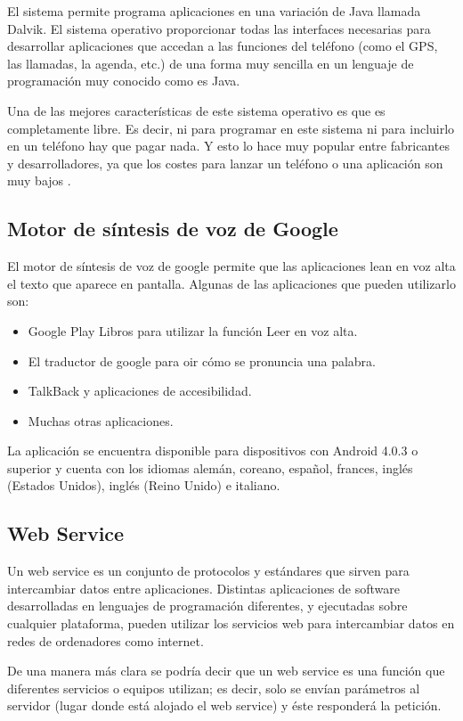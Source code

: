 		El sistema permite programa aplicaciones en una variación de Java llamada Dalvik. El sistema operativo proporcionar todas las interfaces necesarias para desarrollar aplicaciones que accedan a las funciones del teléfono (como el GPS, las llamadas, la agenda, etc.) de una forma muy sencilla en un lenguaje de programación muy conocido como es Java.

		Una de las mejores características de este sistema operativo es que es completamente libre. Es decir, ni para programar en este sistema ni para incluirlo en un teléfono hay que pagar nada. Y esto lo hace muy popular entre fabricantes y desarrolladores, ya que los costes para lanzar un teléfono o una aplicación son muy bajos \cite{Nieto2011}.

		\subsection{Motor de síntesis de voz de Google}

		El motor de síntesis de voz de google permite que las aplicaciones lean en voz alta el texto que aparece en pantalla. Algunas de las aplicaciones que pueden utilizarlo son:
	
		\begin{itemize}
			\item Google Play Libros para utilizar la función Leer en voz alta.
			\item El traductor de google para oir cómo se pronuncia una palabra.
			\item TalkBack y aplicaciones de accesibilidad.
			\item Muchas otras aplicaciones.
		\end{itemize}

		La aplicación se encuentra disponible para dispositivos con Android 4.0.3 o superior y cuenta con los idiomas alemán, coreano, español, frances, inglés (Estados Unidos), inglés (Reino Unido) e italiano.
		
		\subsection{Web Service}
		
		Un web service es un conjunto de protocolos y estándares que sirven para intercambiar datos entre aplicaciones. Distintas aplicaciones de software desarrolladas en lenguajes de programación diferentes, y ejecutadas sobre cualquier plataforma, pueden utilizar los servicios web para intercambiar datos en redes de ordenadores como internet.

De una manera más clara se podría decir que un web service es una función que diferentes servicios o equipos utilizan; es decir, solo se envían parámetros al servidor (lugar donde está alojado el web service) y éste responderá la petición. \cite{webservice}